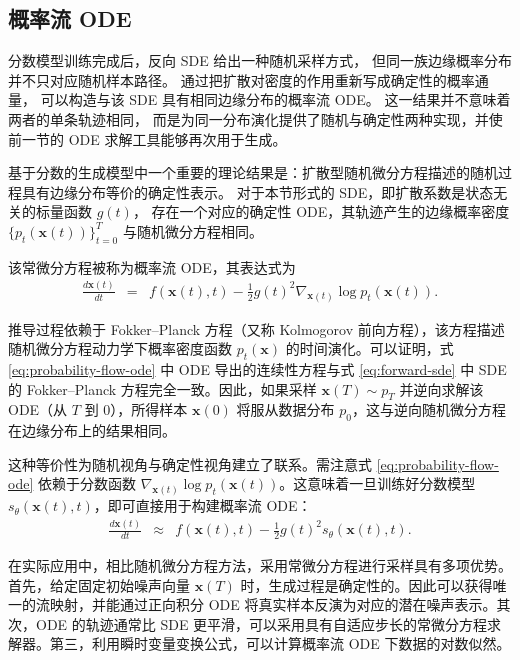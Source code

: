 \documentclass[UTF8,a4paper,zihao=-4,oneside,openany]{ctexbook}
\begin{document}
\subsection{概率流 ODE}

分数模型训练完成后，反向 SDE 给出一种随机采样方式，
但同一族边缘概率分布并不只对应随机样本路径。
通过把扩散对密度的作用重新写成确定性的概率通量，
可以构造与该 SDE 具有相同边缘分布的概率流 ODE。
这一结果并不意味着两者的单条轨迹相同，
而是为同一分布演化提供了随机与确定性两种实现，并使前一节的 ODE 求解工具能够再次用于生成。

基于分数的生成模型中一个重要的理论结果是：扩散型随机微分方程描述的随机过程具有边缘分布等价的确定性表示。
对于本节形式的 SDE，即扩散系数是状态无关的标量函数 $g(t)$，
存在一个对应的确定性 ODE，其轨迹产生的边缘概率密度
$\{p_t(\mathbf{x}(t))\}_{t=0}^T$ 与随机微分方程相同。

该常微分方程被称为概率流 ODE，其表达式为
\begin{eqnarray}
\frac{d\mathbf{x}(t)}{dt} & = & f(\mathbf{x}(t), t) - \frac{1}{2}g(t)^2 \nabla_{\mathbf{x}(t)} \log p_t(\mathbf{x}(t)).
\label{eq:probability-flow-ode}
\end{eqnarray}

推导过程依赖于 Fokker--Planck 方程（又称 Kolmogorov 前向方程），该方程描述随机微分方程动力学下概率密度函数 $p_t(\mathbf{x})$ 的时间演化。可以证明，式 \eqref{eq:probability-flow-ode} 中 ODE 导出的连续性方程与式 \eqref{eq:forward-sde} 中 SDE 的 Fokker--Planck 方程完全一致。因此，如果采样 $\mathbf{x}(T) \sim p_T$ 并逆向求解该 ODE（从 $T$ 到 $0$），所得样本 $\mathbf{x}(0)$ 将服从数据分布 $p_0$，这与逆向随机微分方程在边缘分布上的结果相同。

这种等价性为随机视角与确定性视角建立了联系。需注意式 \eqref{eq:probability-flow-ode} 依赖于分数函数 $\nabla_{\mathbf{x}(t)} \log p_t(\mathbf{x}(t))$。这意味着一旦训练好分数模型 $s_\theta(\mathbf{x}(t), t)$，即可直接用于构建概率流 ODE：
\begin{eqnarray}
\frac{d\mathbf{x}(t)}{dt} & \approx & f(\mathbf{x}(t), t) - \frac{1}{2}g(t)^2 s_\theta(\mathbf{x}(t), t).
\label{eq:learned-probability-flow-ode}
\end{eqnarray}

在实际应用中，相比随机微分方程方法，采用常微分方程进行采样具有多项优势。首先，给定固定初始噪声向量 $\mathbf{x}(T)$ 时，生成过程是确定性的。因此可以获得唯一的流映射，并能通过正向积分 ODE 将真实样本反演为对应的潜在噪声表示。其次，ODE 的轨迹通常比 SDE 更平滑，可以采用具有自适应步长的常微分方程求解器。第三，利用瞬时变量变换公式，可以计算概率流 ODE 下数据的对数似然。
\end{document}
